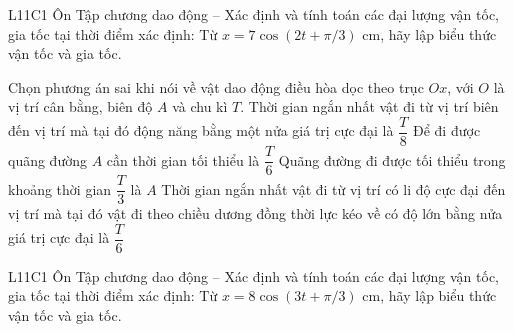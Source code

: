 \begin{ex}
L11C1 Ôn Tập chương dao động – Xác định và tính toán các đại lượng vận tốc, gia tốc tại thời điểm xác định: Từ $x=7\cos(2t+\pi/3)$ cm, hãy lập biểu thức vận tốc và gia tốc.
\choiceTF

\end{ex}

\begin{ex}
Chọn phương án sai khi nói về vật dao động điều hòa dọc theo trục $Ox$, với $O$ là vị trí cân bằng, biên độ $A$ và chu kì $T$.
\choice
{Thời gian ngắn nhất vật đi từ vị trí biên đến vị trí mà tại đó động năng bằng một nửa giá trị cực đại là $\dfrac{T}{8}$}
{Để đi được quãng đường $A$ cần thời gian tối thiểu là $\dfrac{T}{6}$}
{Quãng đường đi được tối thiểu trong khoảng thời gian $\dfrac{T}{3}$ là $A$}
{\True Thời gian ngắn nhất vật đi từ vị trí có li độ cực đại đến vị trí mà tại đó vật đi theo chiều dương đồng thời lực kéo về có độ lớn bằng nửa giá trị cực đại là $\dfrac{T}{6}$}
\end{ex}

\begin{ex}
L11C1 Ôn Tập chương dao động – Xác định và tính toán các đại lượng vận tốc, gia tốc tại thời điểm xác định: Từ $x=8\cos(3t+\pi/3)$ cm, hãy lập biểu thức vận tốc và gia tốc.
\choiceTF

\end{ex}

